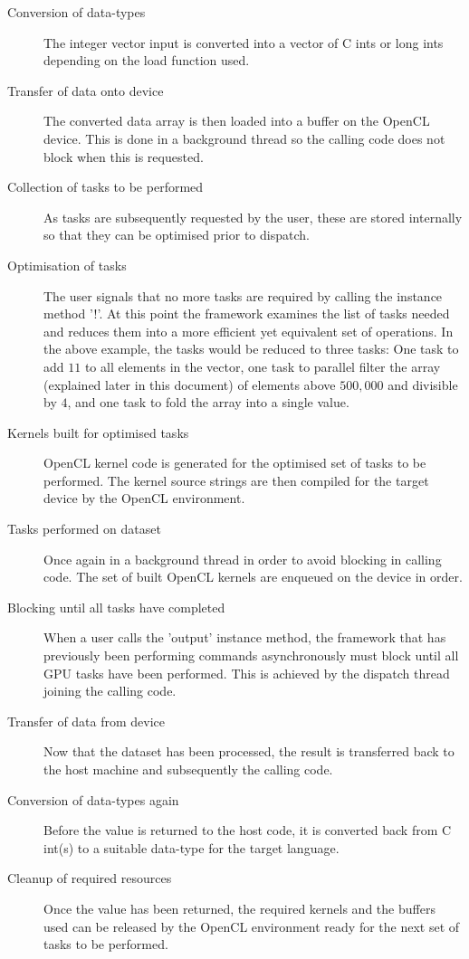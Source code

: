   \begin{description}
    \item[Conversion of data-types]
      The integer vector input is converted into a vector of C ints or long ints depending on the load function used.
    \item[Transfer of data onto device]
      The converted data array is then loaded into a buffer on the OpenCL device. This is done in a background thread so the calling code does not block when this is requested.
    \item[Collection of tasks to be performed]
      As tasks are subsequently requested by the user, these are stored internally so that they can be optimised prior to dispatch.
    \item[Optimisation of tasks]
      The user signals that no more tasks are required by calling the instance method '!'. At this point the framework examines the list of tasks needed and reduces them into a more efficient yet equivalent set of operations. In the above example, the tasks would be reduced to three tasks: One task to add $11$ to all elements in the vector, one task to parallel filter the array (explained later in this document) of elements above $500,000$ and divisible by $4$, and one task to fold the array into a single value.
    \item[Kernels built for optimised tasks]
      OpenCL kernel code is generated for the optimised set of tasks to be performed. The kernel source strings are then compiled for the target device by the OpenCL environment.
    \item[Tasks performed on dataset]
      Once again in a background thread in order to avoid blocking in calling code. The set of built OpenCL kernels are enqueued on the device in order.

    \item[Blocking until all tasks have completed]
      When a user calls the 'output' instance method, the framework that has previously been performing commands asynchronously must block until all GPU tasks have been performed. This is achieved by the dispatch thread joining the calling code.
    \item[Transfer of data from device]
      Now that the dataset has been processed, the result is transferred back to the host machine and subsequently the calling code.
    \item[Conversion of data-types again]
      Before the value is returned to the host code, it is converted back from C int(s) to a suitable data-type for the target language.
    \item[Cleanup of required resources]
      Once the value has been returned, the required kernels and the buffers used can be released by the OpenCL environment ready for the next set of tasks to be performed.
  \end{description}

